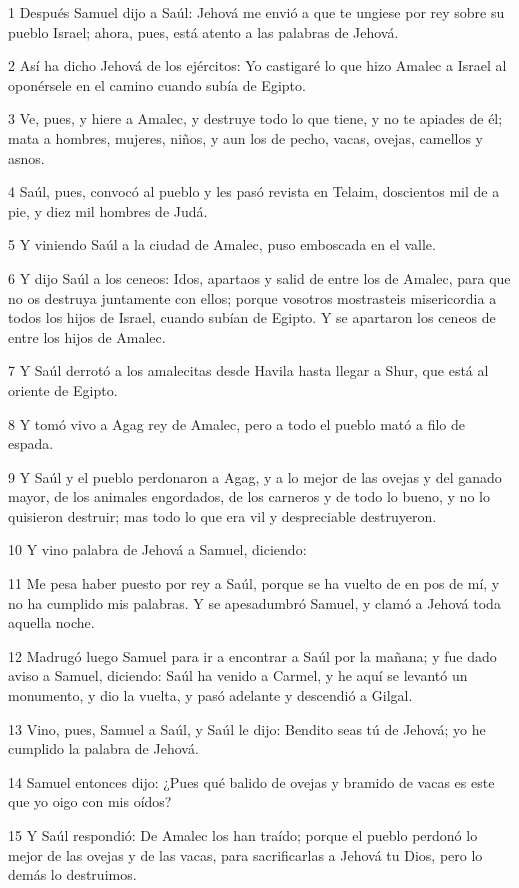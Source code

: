 \par 1 Después Samuel dijo a Saúl: Jehová me envió a que te ungiese por rey sobre su pueblo Israel; ahora, pues, está atento a las palabras de Jehová.
\par 2 Así ha dicho Jehová de los ejércitos: Yo castigaré lo que hizo Amalec a Israel al oponérsele en el camino cuando subía de Egipto. 
\par 3 Ve, pues, y hiere a Amalec, y destruye todo lo que tiene, y no te apiades de él; mata a hombres, mujeres, niños, y aun los de pecho, vacas, ovejas, camellos y asnos.
\par 4 Saúl, pues, convocó al pueblo y les pasó revista en Telaim, doscientos mil de a pie, y diez mil hombres de Judá.
\par 5 Y viniendo Saúl a la ciudad de Amalec, puso emboscada en el valle.
\par 6 Y dijo Saúl a los ceneos: Idos, apartaos y salid de entre los de Amalec, para que no os destruya juntamente con ellos; porque vosotros mostrasteis misericordia a todos los hijos de Israel, cuando subían de Egipto. Y se apartaron los ceneos de entre los hijos de Amalec.
\par 7 Y Saúl derrotó a los amalecitas desde Havila hasta llegar a Shur, que está al oriente de Egipto.
\par 8 Y tomó vivo a Agag rey de Amalec, pero a todo el pueblo mató a filo de espada.
\par 9 Y Saúl y el pueblo perdonaron a Agag, y a lo mejor de las ovejas y del ganado mayor, de los animales engordados, de los carneros y de todo lo bueno, y no lo quisieron destruir; mas todo lo que era vil y despreciable destruyeron.
\par 10 Y vino palabra de Jehová a Samuel, diciendo:
\par 11 Me pesa haber puesto por rey a Saúl, porque se ha vuelto de en pos de mí, y no ha cumplido mis palabras. Y se apesadumbró Samuel, y clamó a Jehová toda aquella noche.
\par 12 Madrugó luego Samuel para ir a encontrar a Saúl por la mañana; y fue dado aviso a Samuel, diciendo: Saúl ha venido a Carmel, y he aquí se levantó un monumento, y dio la vuelta, y pasó adelante y descendió a Gilgal.
\par 13 Vino, pues, Samuel a Saúl, y Saúl le dijo: Bendito seas tú de Jehová; yo he cumplido la palabra de Jehová.
\par 14 Samuel entonces dijo: ¿Pues qué balido de ovejas y bramido de vacas es este que yo oigo con mis oídos?
\par 15 Y Saúl respondió: De Amalec los han traído; porque el pueblo perdonó lo mejor de las ovejas y de las vacas, para sacrificarlas a Jehová tu Dios, pero lo demás lo destruimos.
